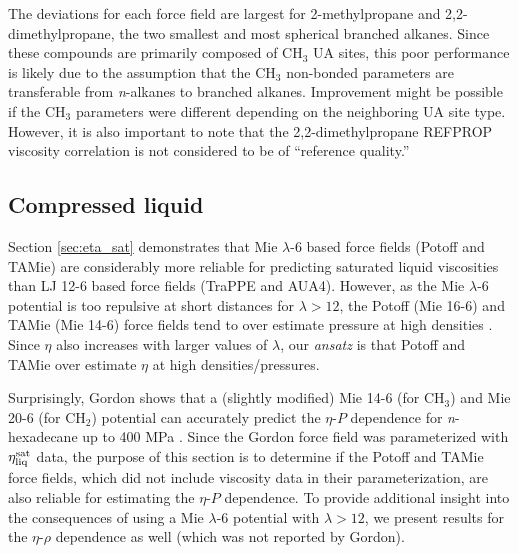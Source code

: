 \documentclass[preprint,review,12pt]{elsarticle}
\begin{document}
	
	The deviations for each force field are largest for 2-methylpropane and 2,2-dimethylpropane, the two smallest and most spherical branched alkanes. Since these compounds are primarily composed of CH$_3$ UA sites, this poor performance is likely due to the assumption that the CH$_3$ non-bonded parameters are transferable from \textit{n}-alkanes to branched alkanes. Improvement might be possible if the CH$_3$ parameters were different depending on the neighboring UA site type. However, it is also important to note that the 2,2-dimethylpropane REFPROP viscosity correlation is not considered to be of ``reference quality.'' \cite{LEMMON-RP10}
	
	\subsection{Compressed liquid} \label{sec:T293highP}
	
	Section \ref{sec:eta_sat} demonstrates that Mie $\lambda$-6 based force fields (Potoff and TAMie) are considerably more reliable for predicting saturated liquid viscosities than LJ 12-6 based force fields (TraPPE and AUA4). However, as the Mie $\lambda$-6 potential is too repulsive at short distances for $\lambda > 12$, the Potoff (Mie 16-6) and TAMie (Mie 14-6) force fields tend to over estimate pressure at high densities \cite{Postdoc_2}. Since $\eta$ also increases with larger values of $\lambda$, our \textit{ansatz} is that Potoff and TAMie over estimate $\eta$ at high densities/pressures. 
	
	Surprisingly, Gordon shows that a (slightly modified) Mie 14-6 (for CH$_3$) and Mie 20-6 (for CH$_2$) potential can accurately predict the $\eta$-$P$ dependence for \textit{n}-hexadecane up to 400 MPa \cite{Gordon2006}. Since the Gordon force field was parameterized with $\eta_{\rm liq}^{\rm sat}$ data, the purpose of this section is to determine if the Potoff and TAMie force fields, which did not include viscosity data in their parameterization, are also reliable for estimating the $\eta$-$P$ dependence. To provide additional insight into the consequences of using a Mie $\lambda$-6 potential with $\lambda > 12$, we present results for the $\eta$-$\rho$ dependence as well (which was not reported by Gordon). 
	
	
\end{document}
